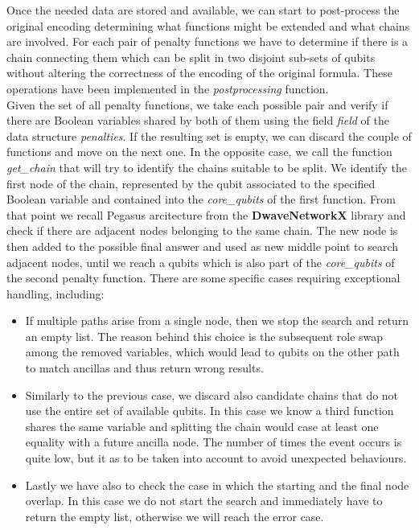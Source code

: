 Once the needed data are stored and available, we can start to post-process the original encoding determining what functions might be extended and what chains are involved. For each pair of penalty functions we have to determine if there is a chain connecting them which can be split in two disjoint sub-sets of qubits without altering the correctness of the encoding of the original formula. 
These operations have been implemented in the \textit{postprocessing} function. \\
Given the set of all penalty functions, we take each possible pair and verify if there are Boolean variables shared by both of them using the field \textit{field} of the data structure \textit{penalties}. If the resulting set is empty, we can discard the couple of functions and move on the next one. In the opposite case, we call the function \textit{get\_chain} that will try to identify the chains suitable to be split. We identify the first node of the chain, represented by the qubit associated to the specified Boolean variable and contained into the \textit{core\_qubits} of the first function. From that point we recall Pegasus arcitecture from the \textbf{DwaveNetworkX} library and check if there are adjacent nodes belonging to the same chain. The new node is then added to the possible final answer and used as new middle point to search adjacent nodes, until we reach a qubits which is also part of the \textit{core\_qubits} of the second penalty function. There are some specific cases requiring exceptional handling, including:

\begin{itemize}
    \item If multiple paths arise from a single node, then we stop the search and return an empty list. The reason behind this choice is the subsequent role swap among the removed variables, which would lead to qubits on the other path to match ancillas and thus return wrong results.
    \item Similarly to the previous case, we discard also candidate chains that do not use the entire set of available qubits. In this case we know a third function shares the same variable and splitting the chain would case at least one equality with a future ancilla node. The number of times the event occurs is quite low, but it as to be taken into account to avoid unexpected behaviours.
    \item Lastly we have also to check the case in which the starting and the final node overlap. In this case we do not start the search and immediately have to return the empty list, otherwise we will reach the error case.
\end{itemize}

